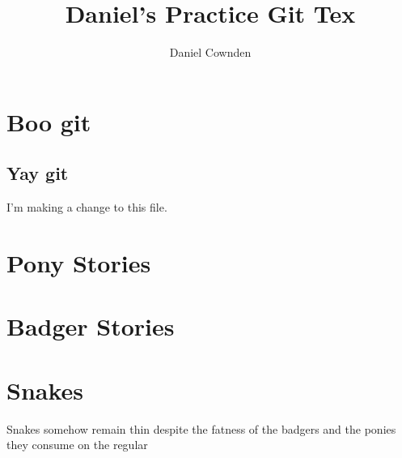 \documentclass[11pt]{amsart}
\title{Daniel's Practice Git Tex}
\author{Daniel Cownden}
\begin{document}
\maketitle
\section{Boo git}
\subsection{Yay git}

I'm making a change to this file.

\section{Pony Stories}

\section{Badger Stories}

\section{Snakes}
Snakes somehow remain thin despite the fatness of the badgers and the ponies they consume on the regular
\end{document}
